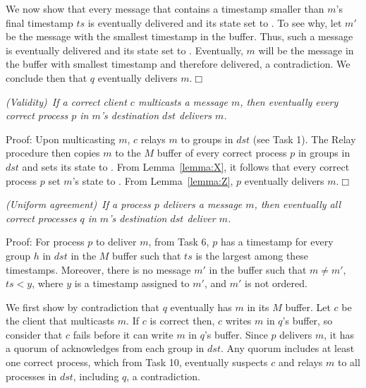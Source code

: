 We now show that every message that contains a timestamp smaller than $m$'s final timestamp $ts$ is eventually delivered and its state set to \done.
To see why, let $m'$ be the message with the smallest timestamp in the buffer.
Thus, such a message is eventually delivered and its state set to \ordered.
Eventually, $m$ will be the message in the buffer with smallest timestamp and therefore delivered, a contradiction.
We conclude then that $q$ eventually delivers $m$.\hfill$\Box$


\vspace{2mm}
\setcounter{proposition}{1}
\begin{proposition}
\textit{(Validity)~If a correct client $c$ multicasts a message $m$, then eventually every correct process $p$ in $m$'s destination $dst$ delivers $m$.}
\end{proposition}
\vspace{2mm}
\noindent
{\sc Proof:} 
Upon multicasting $m$, $c$ relays $m$ to groups in $dst$ (see Task 1).
The Relay procedure then copies $m$ to the $M$ buffer of every correct process $p$ in groups in $dst$ and sets its state to \mcast.
From Lemma~\ref{lemma:X}, it follows that every correct process $p$ set $m$'s state to \ordered.
From Lemma~\ref{lemma:Z}, $p$ eventually delivers $m$.\hfill$\Box$

\vspace{2mm}
\begin{proposition}
  \textit{(Uniform agreement)~If a process $p$ delivers a message $m$, then eventually all correct processes $q$ in $m$'s destination $dst$ deliver $m$.}
\end{proposition}
\vspace{2mm}
\noindent
{\sc Proof:} 
For process $p$ to deliver $m$, from Task 6, $p$ has a timestamp for every group $h$ in $dst$ in the $M$ buffer such that $ts$ is the largest among these timestamps.
Moreover, there is no message $m'$ in the buffer such that $m \neq m'$, $ts < y$, where $y$ is a timestamp assigned to $m'$, and $m'$ is not ordered.

We first show by contradiction that $q$ eventually has $m$ in its $M$ buffer.
Let $c$ be the client that multicasts $m$.
If $c$ is correct then, $c$ writes $m$ in $q$'s buffer, so consider that $c$ fails before it can write $m$ in $q$'s buffer.
Since $p$ delivers $m$, it has a quorum of acknowledges from each group in $dst$.
Any quorum includes at least one correct process, which from Task 10, eventually suspects $c$ and relays $m$ to all processes in $dst$, including $q$, a contradiction.

